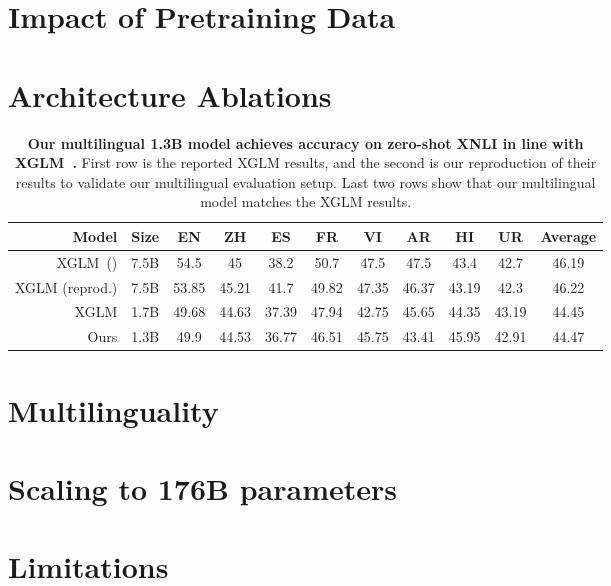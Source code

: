\documentclass[11pt]{article}
\begin{document}

\section{Impact of Pretraining Data}




\section{Architecture Ablations}


\begin{table}[t!]
\begin{center}
\begin{tabular}{@{}rc|cccccccc|c@{}}
\toprule
\textbf{Model} &  \textbf{Size} & EN & ZH & ES & FR & VI & AR & HI & UR & \textbf{Average} \\
\midrule
XGLM~(\citeauthor{XGLM}) & 7.5B & 54.5 & 45 & 38.2 & 50.7 & 47.5 & 47.5 & 43.4 & 42.7 & 46.19 \\
XGLM (reprod.)  & 7.5B & 53.85 & 45.21 & 41.7 & 49.82 & 47.35 & 46.37 & 43.19 & 42.3 & 46.22 \\
XGLM  & 1.7B & 49.68 & 44.63 & 37.39 & 47.94 & 42.75 & 45.65 & 44.35 & 43.19 & 44.45 \\
Ours  & 1.3B & 49.9 & 44.53 & 36.77 & 46.51 & 45.75 & 43.41 & 45.95 & 42.91 & 44.47\\
\bottomrule
\end{tabular}
\end{center}
\caption{\textbf{Our multilingual 1.3B model achieves accuracy on zero-shot XNLI in line with XGLM~\citet{XGLM}.} First row is the reported XGLM results, and the second is our reproduction of their results to validate our multilingual evaluation setup. Last two rows show that our multilingual model matches the XGLM results. } 
\label{tab:mutlilingual_xnli}
\end{table}

\section{Multilinguality}



\section{Scaling to 176B parameters}

 
 
\section{Limitations}
\end{document}
